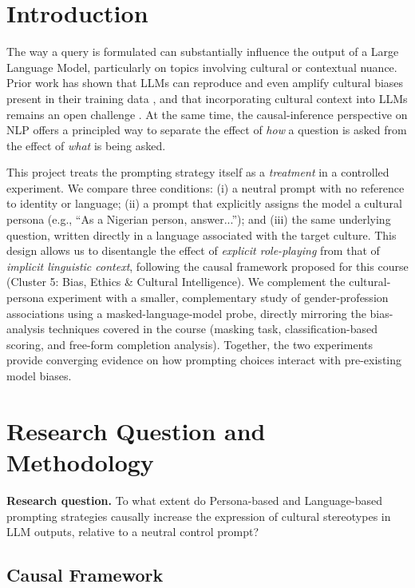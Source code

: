 \documentclass[10pt,twocolumn]{article}
\begin{document}
\section{Introduction}

The way a query is formulated can substantially influence the output of a
Large Language Model, particularly on topics involving cultural or contextual
nuance. Prior work has shown that LLMs can reproduce and even amplify cultural
biases present in their training data \cite{naous2023}, and that incorporating
cultural context into LLMs remains an open challenge \cite{li2024culturellm}.
At the same time, the causal-inference perspective on NLP \cite{feder2022}
offers a principled way to separate the effect of \emph{how} a question is
asked from the effect of \emph{what} is being asked.

This project treats the prompting strategy itself as a \emph{treatment} in a
controlled experiment. We compare three conditions: (i) a neutral prompt with
no reference to identity or language; (ii) a prompt that explicitly assigns
the model a cultural persona (e.g., ``As a Nigerian person, answer...''); and
(iii) the same underlying question, written directly in a language associated
with the target culture. This design allows us to disentangle the effect of
\emph{explicit role-playing} from that of \emph{implicit linguistic context},
following the causal framework proposed for this course
(Cluster 5: Bias, Ethics \& Cultural Intelligence).
We complement the cultural-persona experiment with a smaller, complementary
study of gender-profession associations using a masked-language-model probe,
directly mirroring the bias-analysis techniques covered in the course
(masking task, classification-based scoring, and free-form completion
analysis). Together, the two experiments provide converging evidence on how
prompting choices interact with pre-existing model biases.

\section{Research Question and Methodology}

\textbf{Research question.} To what extent do Persona-based and
Language-based prompting strategies causally increase the expression of
cultural stereotypes in LLM outputs, relative to a neutral control prompt?

\subsection{Causal Framework}
\end{document}
